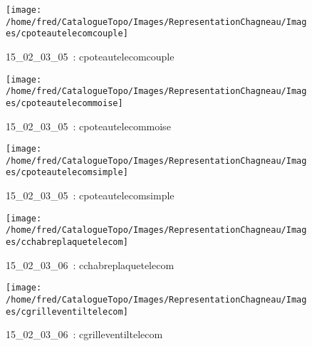 \documentclass[12pt,titlepage]{book}
\begin{document}
\begin{figure}[h!]
  \begin{minipage}[t]{3cm}
    \begin{center}
      \texttt{[image: /home/fred/CatalogueTopo/Images/RepresentationChagneau/Images/cpoteautelecomcouple]}
      \caption[~15\_02\_03\_05]{\small{15\_02\_03\_05~:} \tiny{cpoteautelecomcouple}}\label{cpoteautelecomcouple}
    \end{center}
  \end{minipage}
  \begin{minipage}[t]{3cm}
    \begin{center}
      \texttt{[image: /home/fred/CatalogueTopo/Images/RepresentationChagneau/Images/cpoteautelecommoise]}
      \caption[~15\_02\_03\_05]{\small{15\_02\_03\_05~:} \tiny{cpoteautelecommoise}}\label{cpoteautelecommoise}
    \end{center}
  \end{minipage}
  \begin{minipage}[t]{3cm}
    \begin{center}
      \texttt{[image: /home/fred/CatalogueTopo/Images/RepresentationChagneau/Images/cpoteautelecomsimple]}
      \caption[~15\_02\_03\_05]{\small{15\_02\_03\_05~:} \tiny{cpoteautelecomsimple}}\label{cpoteautelecomsimple}
    \end{center}
  \end{minipage}
  \begin{minipage}[t]{3cm}
    \begin{center}
      \texttt{[image: /home/fred/CatalogueTopo/Images/RepresentationChagneau/Images/cchabreplaquetelecom]}
      \caption[~15\_02\_03\_06]{\small{15\_02\_03\_06~:} \tiny{cchabreplaquetelecom}}\label{cchabreplaquetelecom}
    \end{center}
  \end{minipage}
  \begin{minipage}[t]{3cm}
    \begin{center}
      \texttt{[image: /home/fred/CatalogueTopo/Images/RepresentationChagneau/Images/cgrilleventiltelecom]}
      \caption[~15\_02\_03\_06]{\small{15\_02\_03\_06~:} \tiny{cgrilleventiltelecom}}\label{cgrilleventiltelecom}
    \end{center}
  \end{minipage}
  \begin{minipage}[t]{3cm}

\end{minipage}
\end{figure}
\end{document}
